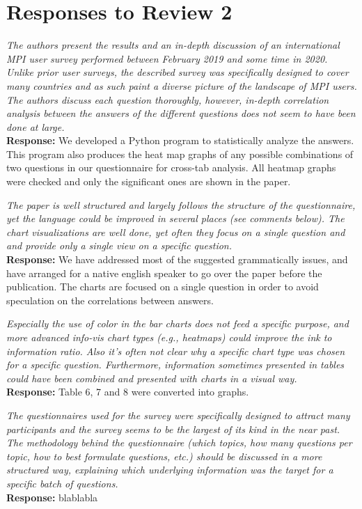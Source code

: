 \documentclass[11pt]{article}
\newcommand{\response}[2]{{\vspace{5mm}\noindent{\bf Comment:} \em #1}\\%
  {\bf Response:} #2}
\begin{document}
\section*{Responses to Review 2}

\response{The authors present the results and an in-depth discussion
  of an international MPI user survey performed between February 2019
  and some time in 2020. Unlike prior user surveys, the described
  survey was specifically designed to cover many countries and as such
  paint a diverse picture of the landscape of MPI users. The authors
  discuss each question thoroughly, however, in-depth correlation
  analysis between the answers of the different questions does not
  seem to have been done at large.}
 {
We developed a Python program to statistically analyze the answers. This program also
produces the heat map graphs of any possible combinations of two
questions in our questionnaire for cross-tab analysis. All heatmap
graphs were checked and only the significant ones are shown in the
paper.
 }


\response{The paper is well structured and largely follows the
  structure of the questionnaire, yet the language could be improved
  in several places (see comments below). The chart visualizations are
  well done, yet often they focus on a single question and and provide
  only a single view on a specific question.}
{
 We have addressed most of the suggested grammatically issues, and have
 arranged for a native english speaker to go over the paper before the
 publication.  The charts are focused on a single question in order to
 avoid speculation on the correlations between answers.
}


\response{Especially the use of color in the bar charts does not feed
  a specific purpose, and more advanced info-vis chart types (e.g.,
  heatmaps) could improve the ink to information ratio.
  Also it's often not clear why a specific chart type was
  chosen for a specific question. Furthermore, information sometimes
  presented in tables could have been combined and presented with
  charts in a visual way.}
{Table 6, 7 and 8 were converted into graphs.}

\response{The questionnaires used for the survey were specifically
  designed to attract many participants and the survey seems to be the
  largest of its kind in the near past. The methodology behind the
  questionnaire (which topics, how many questions per topic, how to
  best formulate questions, etc.) should be discussed in a more
  structured way, explaining which underlying information was the
  target for a specific batch of questions.}
         {
           blablabla
}
\end{document}
